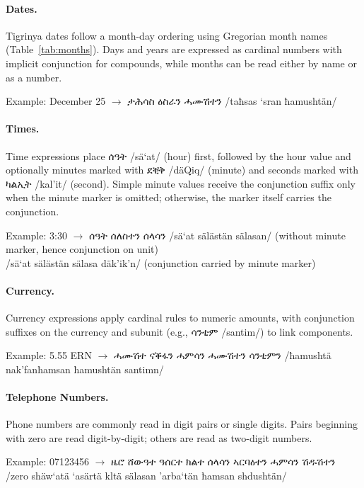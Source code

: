 \documentclass{article}
\newcommand{\ti}[1]{{\geezfont #1}}
\newcommand{\tib}[1]{{\geezfontbold #1}}
\newcommand{\tiipa}[2]{{\geezfont #1} /#2/}
\begin{document}
\paragraph{Dates.} Tigrinya dates follow a month-day ordering using Gregorian month names (Table~\ref{tab:months}). Days and years are expressed as cardinal numbers with implicit conjunction for compounds, while months can be read either by name or as a number.

Example: December 25 $\rightarrow$ \tiipa{ታሕሳስ ዕስራን ሓሙሽተን}{taħsas `sran ħamushtän}

\paragraph{Times.} Time expressions place \tiipa{ሰዓት}{sä`at} (hour) first, followed by the hour value and optionally minutes marked with \tiipa{ደቒቅ}{däQiq} (minute) and seconds marked with \tiipa{ካልኢት}{kal'it} (second). Simple minute values receive the conjunction suffix only when the minute marker is omitted; otherwise, the marker itself carries the conjunction.

Example: 3:30 $\rightarrow$ \ti{ሰዓት ሰለስተን ሰላሳ}\tib{ን}\tiipa{}{sä`at sälästän sälasan} \hfill (without minute marker, hence conjunction on unit) \\
\hspace*{2.65cm}\ti{ሰዓት ሰለስተን ሰላሳ ደቒቅ}\tib{ን}\tiipa{}{sä`at sälästän sälasa däk'ik'n} \hfill (conjunction carried by minute marker)

\paragraph{Currency.} Currency expressions apply cardinal rules to numeric amounts, with conjunction suffixes on the currency and subunit (e.g., \tiipa{ሳንቲም}{santim}) to link components.

Example: 5.55 ERN $\rightarrow$ \ti{ሓሙሽተ ናቕፋ}\tib{ን} \ti{ሓምሳን ሓሙሽተን ሳንቲም}\tib{ን} \tiipa{}{ħamushtä nak'fanħamsan ħamushtän santimn}

\paragraph{Telephone Numbers.} Phone numbers are commonly read in digit pairs or single digits. Pairs beginning with zero are read digit-by-digit; others are read as two-digit numbers.

Example: 07123456 $\rightarrow$ \ti{ዜሮ ሸውዓተ ዓሰርተ ክልተ ሰላሳን ኣርባዕተን ሓምሳን ሽዱሽተን} \\
\hspace*{3.4cm}\tiipa{}{zero shäw`atä `asärtä kltä sälasan 'arba`tän ħamsan shdushtän}
\end{document}
